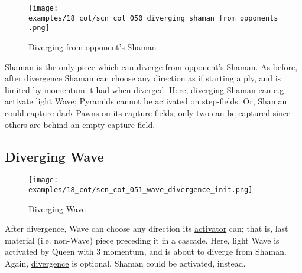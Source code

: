 \vspace*{-1.4\baselineskip}
\noindent
\begin{figure}[!h]
\texttt{[image: examples/18\_cot/scn\_cot\_050\_diverging\_shaman\_from\_opponents.png]}
\vspace*{-1.3\baselineskip}
\caption{Diverging from opponent's Shaman}
\label{fig:scn_cot_050_diverging_shaman_from_opponents}
\end{figure}

\vspace*{-0.5\baselineskip}
Shaman is the only piece which can diverge from opponent's Shaman. As before, after
divergence Shaman can choose any direction as if starting a ply, and is limited by
momentum it had when diverged. \newline
\indent
Here, diverging Shaman can e.g activate light Wave; Pyramids cannot be activated
on step-fields. Or, Shaman could capture dark Pawns on its capture-fields; only two
can be captured since others are behind an empty capture-field.

\clearpage %

\subsection*{Diverging Wave}
\label{sec:Conquest of Tlalocan/Divergence/Diverging Wave}

\vspace*{-1.4\baselineskip}
\noindent
\begin{figure}[!h]
\texttt{[image: examples/18\_cot/scn\_cot\_051\_wave\_divergence\_init.png]}
\vspace*{-1.3\baselineskip}
\caption{Diverging Wave}
\label{fig:scn_cot_051_wave_divergence_init}
\end{figure}

\vspace*{-0.4\baselineskip}
After divergence, Wave can choose any direction its
\hyperref[fig:scn_mv_30_wave_cascading_steps]{activator} can; that is, last material
(i.e. non-Wave) piece preceding it in a cascade. \newline
\indent
Here, light Wave is activated by Queen with 3 momentum, and is about to diverge from
Shaman. \newline
\indent
Again, \hyperref[fig:scn_cot_030_own_shaman_is_divergent_init]{divergence} is optional,
Shaman could be activated, instead.


